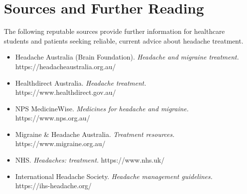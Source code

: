 \section*{Sources and Further Reading}
The following reputable sources provide further information for healthcare students and patients seeking reliable, current advice about headache treatment.

\begin{itemize}
    \item Headache Australia (Brain Foundation). \textit{Headache and migraine treatment.} https://headacheaustralia.org.au/
    \item Healthdirect Australia. \textit{Headache treatment.} https://www.healthdirect.gov.au/
    \item NPS MedicineWise. \textit{Medicines for headache and migraine.} https://www.nps.org.au/
    \item Migraine \& Headache Australia. \textit{Treatment resources.} https://www.migraine.org.au/
    \item NHS. \textit{Headaches: treatment.} https://www.nhs.uk/
    \item International Headache Society. \textit{Headache management guidelines.} https://ihs-headache.org/
\end{itemize}
